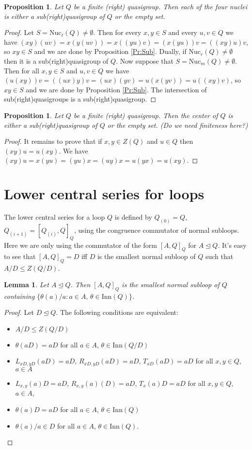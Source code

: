\documentclass{amsart}
\def\inn#1{\mathrm{Inn}(#1)}
\theoremstyle{plain}
\newtheorem{lemma}[theorem]{Lemma}
\newtheorem{proposition}[theorem]{Proposition}
\theoremstyle{definition}
\begin{document}
\begin{proposition}
Let $Q$ be a finite (right) quasigroup. Then each of the four nuclei is either a sub(right)quasigroup of $Q$ or the empty set.
\end{proposition}
\begin{proof}
Let $S=\mathrm{Nuc}_\ell(Q)\ne\emptyset$. Then for every $x,y\in S$ and every $u,v\in Q$ we have $(xy)(uv) = x(y(uv)) = x((yu)v) = (x(yu))v = ((xy)u)v$, so $xy\in S$ and we are done by Proposition \ref{Pr:Sub}. Dually, if $\mathrm{Nuc}_r(Q)\ne\emptyset$ then it is a sub(right)quasigroup of $Q$. Now suppose that $S=\mathrm{Nuc}_m(Q)\ne\emptyset$. Then for all $x,y\in S$ and $u,v\in Q$ we have $(u(xy))v = ((ux)y)v = (ux)(yv) = u(x(yv)) = u((xy)v)$, so $xy\in S$ and we are done by Proposition \ref{Pr:Sub}. The intersection of sub(right)quasigroups is a sub(right)quasigroup.
\end{proof}

\begin{proposition}
Let $Q$ be a finite (right) quasigroup. Then the center of $Q$ is either a sub(right)quasigroup of $Q$ or the empty set. (Do we need finiteness here?)
\end{proposition}
\begin{proof}
It remains to prove that if $x,y\in Z(Q)$ and $u\in Q$ then $(xy)u=u(xy)$. We have $(xy)u = x(yu) = (yu)x = (uy)x = u(yx) = u(xy)$.
\end{proof}

\section{Lower central series for loops}

The lower central series for a loop $Q$ is defined by $Q_{(0)}=Q$, $Q_{(i+1)}=[Q_{(i)},Q]_Q$, using the congruence commutator of normal subloops. Here we are only using the commutator of the form $[A,Q]_Q$ for $A\unlhd Q$. It's easy to see that $[A,Q]_Q=D$ iff $D$ is the smallest normal subloop of $Q$ such that $A/D\le Z(Q/D)$.

\begin{lemma}
Let $A\unlhd Q$. Then $[A,Q]_Q$ is the smallest normal subloop of $Q$ containing $\{\theta(a)/a:a\in A,\,\theta\in\inn{Q}\}$.
\end{lemma}
\begin{proof}
Let $D\unlhd Q$. The following conditions are equivalent:
\begin{itemize}
\item $A/D\le Z(Q/D)$
\item $\theta(aD)=aD$ for all $a\in A$, $\theta\in\inn{Q/D}$
\item $L_{xD,yD}(aD)=aD$, $R_{xD,yD}(aD)=aD$, $T_{xD}(aD)=aD$ for all $x,y\in Q$, $a\in A$
\item $L_{x,y}(a)D = aD$, $R_{x,y}(a)(D)=aD$, $T_x(a)D=aD$ for all $x,y\in Q$, $a\in A$,
\item $\theta(a)D=aD$ for all $a\in A$, $\theta\in\inn{Q}$
\item $\theta(a)/a\in D$ for all $a\in A$, $\theta\in\inn{Q}$.
\end{itemize}
\end{proof}
\end{document}
